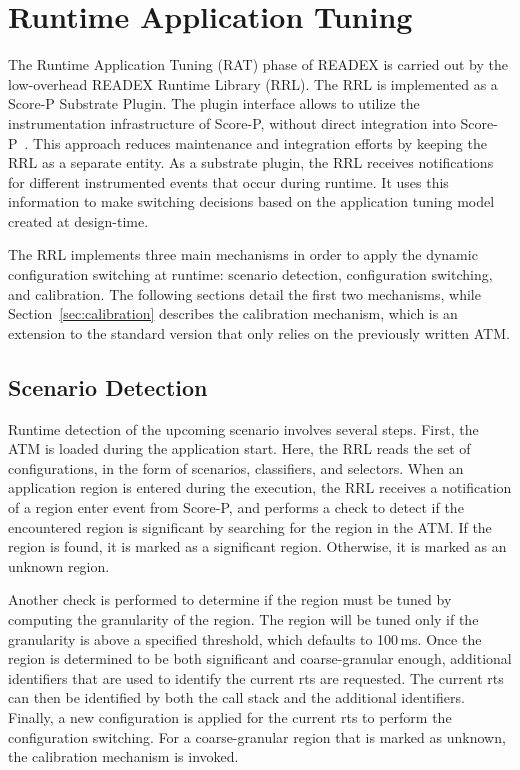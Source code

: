 \section{Runtime Application Tuning} \label{rat}

The Runtime Application Tuning (RAT) phase of READEX is carried out by the low-overhead READEX Runtime Library (RRL). The RRL is implemented as a Score-P Substrate Plugin. The plugin interface allows to utilize the instrumentation infrastructure of Score-P, without direct integration into Score-P~\cite{Schoene2017}. This approach reduces maintenance and integration efforts by keeping the RRL as a separate entity. As a substrate plugin, the RRL receives notifications for different instrumented events that occur during runtime. It uses this information to make switching decisions based on the application tuning model created at design-time.

The RRL implements three main mechanisms in order to apply the dynamic configuration switching at runtime: scenario detection, configuration switching, and calibration. The following sections detail the first two mechanisms, while Section~\ref{sec:calibration} describes the calibration mechanism, which is an extension to the standard version that only relies on the previously written ATM.


\subsection{Scenario Detection}\label{scenario-detection}
Runtime detection of the upcoming scenario involves several steps. First, the ATM is loaded during the application start. Here, the RRL reads the set of configurations, in the form of scenarios, classifiers, and selectors. When an application region is entered during the execution, the RRL receives a notification of a region enter event from Score-P, and performs a check to detect if the encountered region is significant by searching for the region in the ATM. If the region is found, it is marked as a significant region. Otherwise, it is marked as an unknown region. 

Another check is performed to determine if the region must be tuned by computing the granularity of the region. The region will be tuned only if the granularity is above a specified threshold, which defaults to 100\,ms. Once the region is determined to be both significant and coarse-granular enough, additional identifiers that are used to identify the current rts are requested. The current rts can then be identified by both the call stack and the additional identifiers. Finally, a new configuration is applied for the current rts to perform the configuration switching.
For a coarse-granular region that is marked as unknown, the calibration mechanism is invoked.

